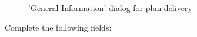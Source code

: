 \begin{figure}[H]
\caption{'General Information' dialog for plan delivery}
\end{figure}

Complete the following fields:

